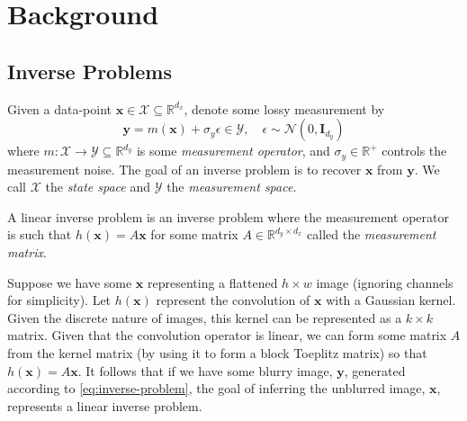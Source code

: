 \chapter{Background} \label{chap:background}

\section{Inverse Problems}\label{sec:inverse-problems}

\begin{definition}\label{def:inverse-problem}
    Given  a data-point $\mathbf{x} \in \mathcal{X} \subseteq \mathbb{R}^{d_x}$,
    denote some lossy measurement by
    \begin{equation}
        \mathbf{y} = m(\mathbf{x}) + \sigma_y\epsilon \in \mathcal{Y},\quad \epsilon \sim \mathcal{N}\left(0, \mathbf{I}_{d_y}\right) \label{eq:inverse-problem}
    \end{equation}
    where $m: \mathcal{X} \to \mathcal{Y} \subseteq \mathbb{R}^{d_y}$ is some \emph{measurement operator},
    and $\sigma_y \in \mathbb{R}^+$ controls the measurement noise. The goal of an inverse problem
    is to recover $\mathbf{x}$ from $\mathbf{y}$. We call $\mathcal{X}$ the \emph{state space} and
    $\mathcal{Y}$ the \emph{measurement space}.
\end{definition}

\begin{definition}\label{def:linear-inverse-problem}
    A linear inverse problem is an inverse problem where the measurement operator is such that
    $h(\mathbf{x}) = A\mathbf{x}$ for some matrix $A \in \mathbb{R}^{d_y \times d_x}$ called the
    \emph{measurement matrix}.
\end{definition}

\begin{example}
    Suppose we have some $\mathbf{x}$ representing a flattened $h\times w$ image (ignoring channels
    for simplicity). Let $h(\mathbf{x})$ represent the convolution of $\mathbf{x}$ with a Gaussian
    kernel. Given the discrete nature of images, this kernel can be represented as a
    $k \times k$ matrix. Given that the convolution operator is linear, we can form some matrix $A$
    from the kernel matrix (by using it to form a block Toeplitz matrix) so that
    $h(\mathbf{x}) = A\mathbf{x}$. It follows that if we have some blurry image, $\mathbf{y}$,
    generated according to \ref{eq:inverse-problem}, the goal of inferring the unblurred image,
    $\mathbf{x}$, represents a linear inverse problem.
\end{example}

